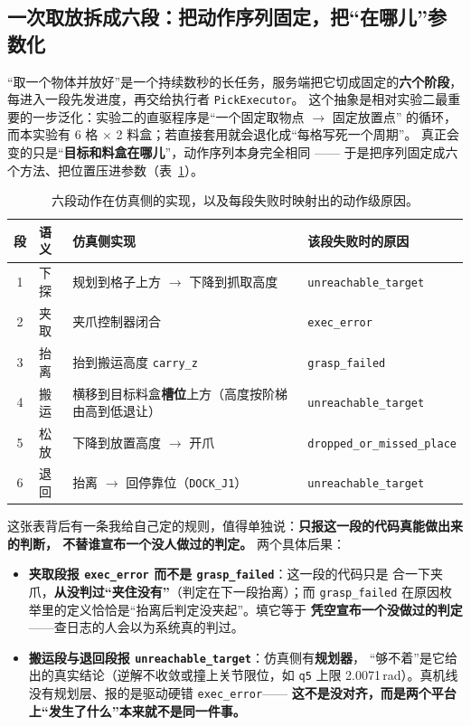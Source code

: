 \documentclass[12pt,a4paper]{ctexart}
\begin{document}
\subsection{一次取放拆成六段：把动作序列固定，把“在哪儿”参数化}

“取一个物体并放好”是一个持续数秒的长任务，服务端把它切成固定的\textbf{六个阶段}，
每进入一段先发进度，再交给执行者 \texttt{PickExecutor}。
这个抽象是相对实验二最重要的一步泛化：实验二的直驱程序是“一个固定取物点 $\to$ 固定放置点”
的循环，而本实验有 6 格 $\times$ 2 料盒；若直接套用就会退化成“每格写死一个周期”。
真正会变的只是“\textbf{目标和料盒在哪儿}”，动作序列本身完全相同 ——
于是把序列固定成六个方法、把位置压进参数（表~\ref{tab:stage}）。

\begin{table}[htbp]
  \centering
  \small
  \begin{tabular}{@{}c l p{5.4cm} p{4.4cm}@{}}
    \toprule
    段 & 语义 & 仿真侧实现 & 该段失败时的原因 \\
    \midrule
    1 & 下探 & 规划到格子上方 $\to$ 下降到抓取高度 & \texttt{unreachable\_target} \\
    2 & 夹取 & 夹爪控制器闭合 & \texttt{exec\_error} \\
    3 & 抬离 & 抬到搬运高度 \texttt{carry\_z} & \texttt{grasp\_failed} \\
    4 & 搬运 & 横移到目标料盒\textbf{槽位}上方（高度按阶梯由高到低退让） & \texttt{unreachable\_target} \\
    5 & 松放 & 下降到放置高度 $\to$ 开爪 & \texttt{dropped\_or\_}\allowbreak\texttt{missed\_place} \\
    6 & 退回 & 抬离 $\to$ 回停靠位（\texttt{DOCK\_J1}） & \texttt{unreachable\_target} \\
    \bottomrule
  \end{tabular}
  \caption{六段动作在仿真侧的实现，以及每段失败时映射出的动作级原因。}
  \label{tab:stage}
\end{table}

这张表背后有一条我给自己定的规则，值得单独说：\textbf{只报这一段的代码真能做出来的判断，
不替谁宣布一个没人做过的判定。} 两个具体后果：

\begin{itemize}[leftmargin=1.6em]
  \item \textbf{夹取段报 \texttt{exec\_error} 而不是 \texttt{grasp\_failed}}：这一段的代码只是
        合一下夹爪，\textbf{从没判过“夹住没有”}（判定在下一段抬离）；而
        \texttt{grasp\_failed} 在原因枚举里的定义恰恰是“抬离后判定没夹起”。填它等于
        \textbf{凭空宣布一个没做过的判定}——查日志的人会以为系统真的判过。
  \item \textbf{搬运段与退回段报 \texttt{unreachable\_target}}：仿真侧有\textbf{规划器}，
        “够不着”是它给出的真实结论（逆解不收敛或撞上关节限位，如 \texttt{q5} 上限
        2.0071\,rad）。真机线没有规划层、报的是驱动硬错 \texttt{exec\_error}——
        \textbf{这不是没对齐，而是两个平台上“发生了什么”本来就不是同一件事。}
\end{itemize}
\end{document}
